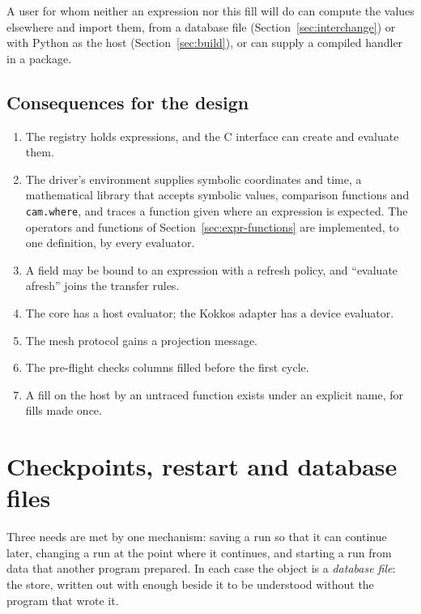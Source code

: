 \documentclass[11pt,a4paper]{article}
\newcommand{\code}[1]{\texttt{#1}}
\begin{document}
A user for whom neither an expression nor this fill will do can compute the
values elsewhere and import them, from a database file
(Section~\ref{sec:interchange}) or with Python as the host
(Section~\ref{sec:build}), or can supply a compiled handler in a package.

\subsection{Consequences for the design}

\begin{enumerate}
  \item The registry holds expressions, and the C interface can create and
        evaluate them.
  \item The driver's environment supplies symbolic coordinates and time, a
        mathematical library that accepts symbolic values, comparison
        functions and \code{cam.where}, and traces a function given where
        an expression is expected.  The operators and functions of
        Section~\ref{sec:expr-functions} are implemented, to one
        definition, by every evaluator.
  \item A field may be bound to an expression with a refresh policy, and
        \enquote{evaluate afresh} joins the transfer rules.
  \item The core has a host evaluator; the Kokkos adapter has a device
        evaluator.
  \item The mesh protocol gains a projection message.
  \item The pre-flight checks columns filled before the first cycle.
  \item A fill on the host by an untraced function exists under an explicit
        name, for fills made once.
\end{enumerate}

\section{Checkpoints, restart and database files}
\label{sec:checkpoint}

Three needs are met by one mechanism: saving a run so that it can continue
later, changing a run at the point where it continues, and starting a run
from data that another program prepared.  In each case the object is a
\emph{database file}: the store, written out with enough beside it to be
understood without the program that wrote it.
\end{document}
